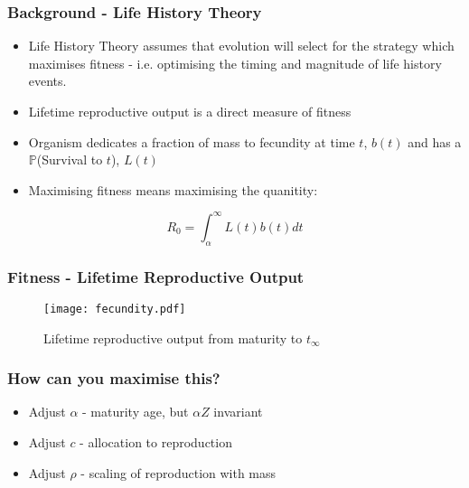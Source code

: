 \documentclass[handout]{beamer}
\begin{document}
\begin{frame}
	\frametitle{Background - Life History Theory}
	\begin{itemize}
		\item Life History Theory assumes that evolution will select for the strategy which maximises fitness - i.e. optimising the timing and magnitude of life history events.
		\item Lifetime reproductive output is a direct measure of fitness
		\item Organism dedicates a fraction of mass to fecundity at time $t$, $b(t)$ and has a $\mathbb{P}$(Survival to $t$), $L(t)$
		\item Maximising fitness means maximising the quanitity:
	\end{itemize}
	\begin{equation*}
		R_0 = \int_{\alpha}^{\infty}L(t)b(t) dt
	\end{equation*}

	
\end{frame}


\begin{frame}
	\frametitle{Fitness - Lifetime Reproductive Output}
	\bigskip
	\begin{figure}
		\texttt{[image: fecundity.pdf]}
		\caption{Lifetime reproductive output from maturity to $t_{\infty}$}
	\end{figure}
\end{frame}

\begin{frame}
	\frametitle{How can you maximise this?}
	\bigskip
	\begin{itemize}
		\item Adjust $\alpha$ - maturity age, but $\alpha Z$ invariant
		\item Adjust $c$ - allocation to reproduction
		\item Adjust $\rho$ - scaling of reproduction with mass
	\end{itemize}
\end{frame}
\end{document}
